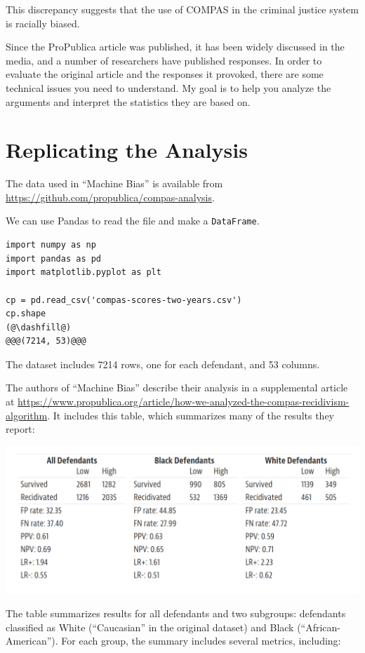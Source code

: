 This discrepancy suggests that the use of COMPAS in the criminal justice
system is racially biased.

Since the ProPublica article was published, it has been widely discussed
in the media, and a number of researchers have published responses. In
order to evaluate the original article and the responses it provoked,
there are some technical issues you need to understand. My goal is to
help you analyze the arguments and interpret the statistics they are
based on.

\hypertarget{replicating-the-analysis}{%
\section{Replicating the Analysis}\label{replicating-the-analysis}}

The data used in ``Machine Bias'' is available from
\url{https://github.com/propublica/compas-analysis}.

We can use Pandas to read the file and make a
\passthrough{\lstinline!DataFrame!}.

\begin{lstlisting}[]
import numpy as np
import pandas as pd
import matplotlib.pyplot as plt

cp = pd.read_csv('compas-scores-two-years.csv')
cp.shape
(@\dashfill@)
@@@(7214, 53)@@@
\end{lstlisting}

The dataset includes 7214 rows, one for each defendant, and 53 columns.

The authors of ``Machine Bias'' describe their analysis in a
supplemental article at
\url{https://www.propublica.org/article/how-we-analyzed-the-compas-recidivism-algorithm}.
It includes this table, which summarizes many of the results they
report:

\includegraphics{chapters/figs/machine_bias_table.png}

The table summarizes results for all defendants and two subgroups:
defendants classified as White (``Caucasian'' in the original dataset)
and Black (``African-American''). For each group, the summary includes
several metrics, including:

